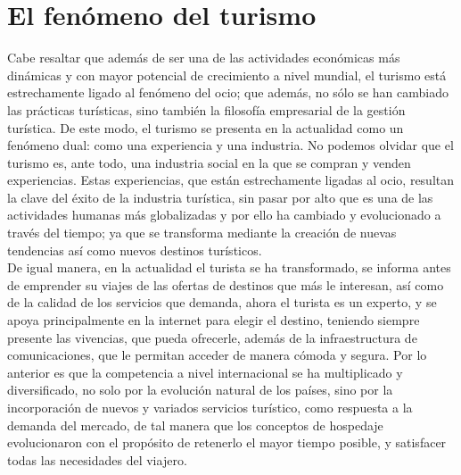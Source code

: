 \section{El fenómeno del turismo}

Cabe resaltar que además de ser una de las actividades económicas más dinámicas y con mayor potencial de crecimiento a nivel mundial, el turismo está estrechamente ligado al fenómeno del ocio; que además, no sólo se han cambiado las prácticas turísticas, sino también la filosofía empresarial de la gestión turística. De este modo, el turismo se presenta en la actualidad como un fenómeno dual: como una experiencia y una industria. No podemos olvidar que el turismo es, ante todo, una industria social en la que se compran y venden experiencias. Estas experiencias, que están estrechamente ligadas al ocio, resultan la clave del éxito de la industria turística, sin pasar por alto que es una de las actividades humanas más globalizadas y por ello ha cambiado y evolucionado a través del tiempo; ya que se transforma mediante la creación de nuevas tendencias así como nuevos destinos turísticos.\\

De igual manera, en la actualidad el turista se ha transformado, se informa antes de emprender su viajes de las ofertas de destinos que más le interesan, así como de la calidad de los servicios que demanda, ahora el turista es un experto, y se apoya principalmente en la internet para elegir el destino, teniendo siempre presente las vivencias, que pueda ofrecerle, además de la infraestructura de comunicaciones, que le permitan acceder de manera cómoda y segura. Por lo anterior es que la competencia a nivel internacional se ha multiplicado y diversificado, no solo por la evolución natural de los países, sino por la incorporación de nuevos y variados servicios turístico, como respuesta a la demanda del mercado, de tal manera que los conceptos de hospedaje evolucionaron con el propósito de retenerlo el mayor tiempo posible, y satisfacer todas las necesidades del viajero.